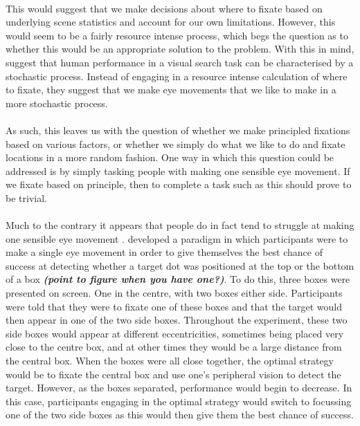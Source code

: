 \documentclass[12pt]{article}
\begin{document}
\paragraph{} This would suggest that we make decisions about where to fixate based on underlying scene statistics and account for our own limitations. However, this would seem to be a fairly resource intense process, which begs the question as to whether this would be an appropriate solution to the problem. With this in mind, \cite{clarke2016stocha} suggest that human performance in a visual search task can be characterised by a stochastic process. Instead of engaging in a resource intense calculation of where to fixate, they suggest that we make eye movements that we like to make in a more stochastic process. 

\paragraph{} As such, this leaves us with the question of whether we make principled fixations based on various factors, or whether we simply do what we like to do and fixate locations in a more random fashion. One way in which this question could be addressed is by simply tasking people with making one sensible eye movement. If we fixate based on principle, then to complete a task such as this should prove to be trivial. 

\paragraph{} Much to the contrary it appears that people do in fact tend to struggle at making one sensible eye movement \citep{morvan2012human,clarke2015failure}. \cite{morvan2012human} developed a paradigm in which participants were to make a single eye movement in order to give themselves the best chance of success at detecting whether a target dot was positioned at the top or the bottom of a box \textbf{\textit{(point to figure when you have one?)}}. To do this, three boxes were presented on screen. One in the centre, with two boxes either side. Participants were told that they were to fixate one of these boxes and that the target would then appear in one of the two side boxes. Throughout the experiment, these two side boxes would appear at different eccentricities, sometimes being placed very close to the centre box, and at other times they would be a large distance from the central box. When the boxes were all close together, the optimal strategy would be to fixate the central box and use one's peripheral vision to detect the target. However, as the boxes separated, performance would begin to decrease. In this case, participants engaging in the optimal strategy would switch to focussing one of the two side boxes as this would then give them the best chance of success. 
\end{document}
